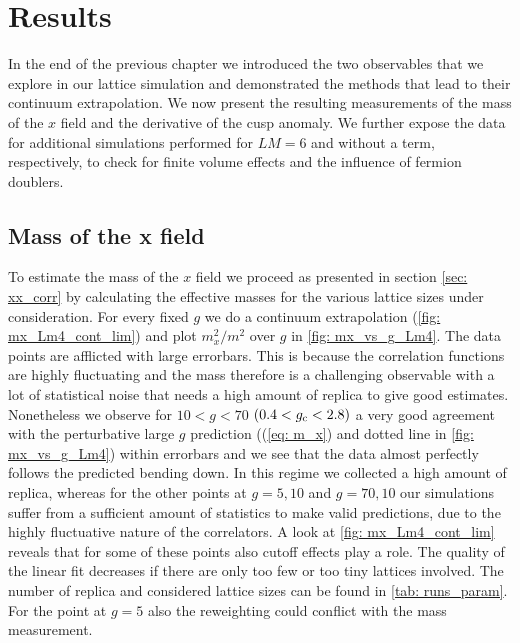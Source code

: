 \chapter{Results}\label{ch: results}
In the end of the previous chapter we introduced the two observables that we explore in our lattice simulation and demonstrated the methods that lead to their continuum extrapolation. We now present the resulting measurements of the mass of the $x$ field and the derivative of the cusp anomaly. We further expose the data for additional simulations performed for $LM=6$ and without a  term, respectively, to check for finite volume effects and the influence of fermion doublers.
%
%
%
%
%
%
\section[Mass of the x field]{Mass of the x field}
To estimate the mass of the $x$ field we proceed as presented in section \ref{sec: xx_corr} by calculating the effective masses for the various lattice sizes under consideration. For every fixed $g$ we do a continuum extrapolation (\autoref{fig: mx_Lm4_cont_lim}) and plot $m_{x}^{2}/m^{2}$ over $g$ in \autoref{fig: mx_vs_g_Lm4}. The data points are afflicted with large errorbars. This is because the correlation functions are highly fluctuating and the mass therefore is a challenging observable with a lot of statistical noise that needs a high amount of replica to give good estimates. Nonetheless we observe for $10 < g < 70$ $(0.4 < g_{\rm c} < 2.8)$ a very good agreement with the perturbative large $g$ prediction ((\ref{eq: m_x}) and dotted line in \autoref{fig: mx_vs_g_Lm4}) within errorbars and we see that the data almost perfectly follows the predicted bending down. In this regime we collected a high amount of replica, whereas for the other points at $g=5,10$ and $g=70,10$ our simulations suffer from a sufficient amount of statistics to make valid predictions, due to the highly fluctuative nature of the correlators. A look at \autoref{fig: mx_Lm4_cont_lim} reveals that for some of these points also cutoff effects play a role. The quality of the linear fit decreases if there are only too few or too tiny lattices involved. The number of replica and considered lattice sizes can be found in \autoref{tab: runs_param}. For the point at $g=5$ also the reweighting could conflict with the mass measurement.
%
%
%
